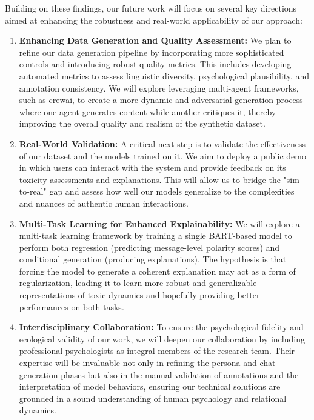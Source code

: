 \documentclass[twocolumn]{ceurart}
\begin{document}
Building on these findings, our future work will focus on several key directions aimed at enhancing the robustness and real-world applicability of our approach:

\begin{enumerate}
    \item \textbf{Enhancing Data Generation and Quality Assessment:} We plan to refine our data generation pipeline by incorporating more sophisticated controls and introducing robust quality metrics. This includes developing automated metrics to assess linguistic diversity, psychological plausibility, and annotation consistency. We will explore leveraging multi-agent frameworks, such as crewai, to create a more dynamic and adversarial generation process where one agent generates content while another critiques it, thereby improving the overall quality and realism of the synthetic dataset.

    \item \textbf{Real-World Validation:} A critical next step is to validate the effectiveness of our dataset and the models trained on it. We aim to deploy a public demo in which users can interact with the system and provide feedback on its toxicity assessments and explanations. This will allow us to bridge the "sim-to-real" gap and assess how well our models generalize to the complexities and nuances of authentic human interactions.

    \item \textbf{Multi-Task Learning for Enhanced Explainability:} We will explore a multi-task learning framework by training a single BART-based model to perform both regression (predicting message-level polarity scores) and conditional generation (producing explanations). The hypothesis is that forcing the model to generate a coherent explanation may act as a form of regularization, leading it to learn more robust and generalizable representations of toxic dynamics and hopefully providing better performances on both tasks.

    \item \textbf{Interdisciplinary Collaboration:} To ensure the psychological fidelity and ecological validity of our work, we will deepen our collaboration by including professional psychologists as integral members of the research team. Their expertise will be invaluable not only in refining the persona and chat generation phases but also in the manual validation of annotations and the interpretation of model behaviors, ensuring our technical solutions are grounded in a sound understanding of human psychology and relational dynamics.
\end{enumerate}
\end{document}
